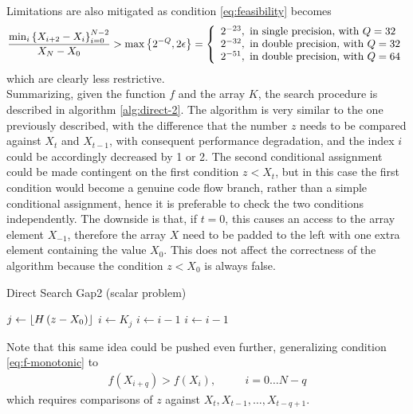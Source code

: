 \documentclass[preprint,1p,times]{elsarticle}
\begin{document}
Limitations are also mitigated as condition \eqref{eq:feasibility} becomes
\begin{equation}
\frac{\min_i\left \{ X_{i+2}-X_i \right \}_{i=0}^{N-2}}{X_N-X_0} 
> \max \left \{ 2^{-Q}, 2\epsilon \right \} 
= \left\{ \begin{array}{l}
2^{-23},\text{   in single precision, with }Q=32 \\
2^{-32},\text{   in double precision, with }Q=32 \\
2^{-51},\text{   in double precision, with }Q=64
\end{array}\right.
\end{equation}
which are clearly less restrictive. \\

Summarizing, given the function $f$ and the array $K$, the search procedure is described in algorithm \ref{alg:direct-2}. The algorithm is very similar to the one previously described, with the difference that the number $z$ needs to be compared against $X_t$ and $X_{t-1}$, with consequent performance degradation, and the index $i$ could be accordingly decreased by 1 or 2. The second conditional assignment could be made contingent on the first condition $z<X_t$, but in this case the first condition would become a genuine code flow branch, rather than a simple conditional assignment, hence it is preferable to check the two conditions independently. The downside is that, if $t=0$, this causes an access to the array element $X_{-1}$, therefore the array $X$ need to be padded to the left with one extra element containing the value $X_0$. This does not affect the correctness of the algorithm because the condition $z<X_0$ is always false.

\begin{algorithm}[ht]
	\caption{Direct Search Gap2 (scalar problem)}
	\label{alg:direct-2}
	\begin{algorithmic}
		\State $j \leftarrow \left \lfloor H\, (z-X_0) \right \rfloor$
		\State $i \leftarrow K_j$
		\State $i \leftarrow i-1$ 
		\EndIf
		\State $i \leftarrow i-1$ 
		\EndIf
		\EndFunction
	\end{algorithmic}
\end{algorithm}

Note that this same idea could be pushed even further, generalizing condition \eqref{eq:f-monotonic} to
\begin{align}
\label{eq:f-monotonic-n}
f(X_{i+q}) > f(X_i), &&\quad  i=0 \dots N-q
\end{align}
which requires comparisons of $z$ against $X_t, X_{t-1}, \dots, X_{t-q+1}$.
\end{document}
